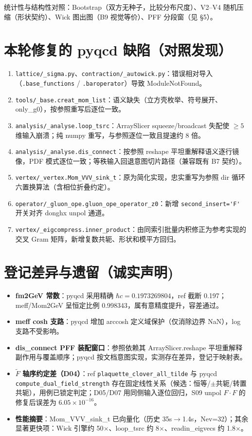 \documentclass[10.5pt]{ctexart}
\begin{document}
统计性与结构性对照：Bootstrap（双方无种子，比较分布尺度）、V2--V4 随机压缩（形状契约）、Wick 图出图（B9 视觉等价）、PFF 分段窗（见 \S5）。

\section{本轮修复的 pyqcd 缺陷（对照发现）}
\begin{enumerate}
\item \verb|lattice/_sigma.py|、\verb|contraction/_autowick.py|：错误相对导入（\verb|.base_functions| / \verb|.baroperator|）导致 ModuleNotFound。
\item \verb|tools/_base.creat_mom_list|：语义缺失（立方壳枚举、符号展开、only\_g0），按参照重写后逐位一致。
\item \verb|analysis/_analyse.loop_tsrc|：ArraySlicer squeeze/broadcast 失配使 $\geq 5$ 维输入崩溃；纯 numpy 重写，与参照逐位一致且提速约 8 倍。
\item \verb|analysis/_analyse.dis_connect|：按参照 reshape 平坦重解释语义逐行镜像，PDF 模式逐位一致；等秩输入回退意图切片路径（兼容既有 B7 契约）。
\item \verb|vertex/_vertex.Mom_VVV_sink_t|：原为简化实现，忠实重写为参照 dir 循环六置换算法（含相位折叠约定）。
\item \verb|operator/_gluon_ope.gluon_ope_operator_z0|：新增 \verb|second_insert='F'| 开关对齐 donghx unpol 通道。
\item \verb|vertex/_eigcompress.inner_product|：由同索引批量内积修正为参考实现的交叉 Gram 矩阵，新增复数共轭、形状和模平方回归。
\end{enumerate}

\section{登记差异与遗留（诚实声明)}
\begin{itemize}
\item \textbf{fm2GeV 常数}：pyqcd 采用精确 $\hbar c=0.1973269804$，ref 截断 0.197；meff/Mom2GeV 呈恒定比例 0.998343，属有意精度提升，容差通过。
\item \textbf{meff cosh 支路}：pyqcd 增加 arccosh 定义域保护（仅消除边界 NaN），log 支路不受影响。
\item \textbf{dis\_connect PFF 装配窗口}：参照依赖其 ArraySlicer.reshape 平坦重解释副作用与覆盖顺序；pyqcd 按文档意图实现，实测存在差异，登记于映射表。
\item \textbf{$\tilde F$ 轴序约定差（D04）}：ref \verb|plaquette_clover_all_tilde| 与 pyqcd \verb|compute_dual_field_strength| 存在固定线性关系（候选：恒等/$\pm$共轭/转置共轭），用例已锁定判定；D05/D07 用同侧输入逐位回归，S09 unpol $F\cdot F$ 的修复后误差为 $6.05\times10^{-16}$。
\item \textbf{性能摘要}：Mom\_VVV\_sink\_t 已向量化（历史 35s$\rightarrow$1.4s，Nev=32）；其余显著更快项：Wick 引擎约 50$\times$、loop\_tsrc 约 8$\times$、readin\_eigvecs 约 1.8$\times$。
\end{itemize}
\end{document}
